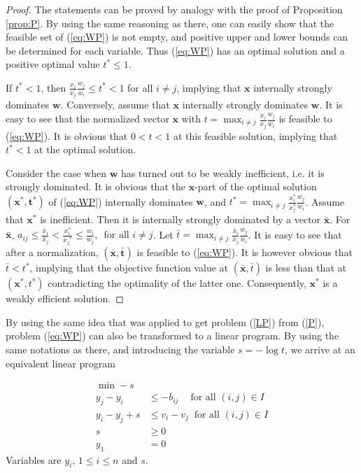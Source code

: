 \documentclass{article}
\theoremstyle{plain}
\begin{document}
\begin{proof}
The statements can be proved by analogy with the proof of Proposition \ref{prop:P}. By using the same reasoning as there, one can easily show that the feasible set of (\ref{eq:WP}) is not empty, and positive upper and lower bounds can be determined for each variable. Thus (\ref{eq:WP}) has an optimal solution and a positive optimal value $t^{\ast}\le 1$.

If $t^{\ast} < 1$, then
$\frac{x_{i}}{x_{j}} \frac{w_{j}}{w_{i}}\le t^{\ast} < 1$ for all $i \neq j$, implying that $\mathbf{x}$ internally strongly dominates $\mathbf{w}$. Conversely, assume that $\mathbf{x}$ internally strongly dominates $\mathbf{w}$. It is easy to see that the normalized vector $\mathbf{x}$ with
$t = \max_{i \neq j}\frac{x_{i}}{x_{j}} \frac{w_{j}}{w_{i}}$ is feasible to (\ref{eq:WP}). It is obvious that $0<t<1$ at this feasible solution, implying that $t^{\ast} < 1$ at the optimal solution.

Consider the case when $\mathbf{w}$ has turned out to be weakly inef{\kern0pt}f{\kern0pt}icient, i.e. it is strongly dominated.  It is obvious that the $\mathbf{x}$-part of the optimal solution $(\mathbf{x}^{\ast},\mathbf{t}^{\ast})$ of (\ref{eq:WP}) internally dominates $\mathbf{w}$, and $t^{\ast}=\max_{i \neq j} \frac{x_{i}^{\ast}}{x_{j}^{\ast}} \frac{w_{j}}{w_{i}}$. Assume that $\mathbf{x}^{\ast}$ is inef{\kern0pt}f{\kern0pt}icient. Then it is internally strongly dominated by a vector $\mathbf{\bar x}$. For $\mathbf{\bar x}$,
$a_{ij}\le\frac{\bar x_i}{\bar x_j} < \frac{x_i^{\ast}}{{x_j}^{\ast}}\le\frac{ w_i}{w_j},\, \text{ for all } i \neq j$.   Let
$\bar t=\max_{i \neq j} \frac{\bar x_{i}}{\bar x_{j}} \frac{w_{j}}{w_{i}}$.
It is easy to see that after a normalization, $(\mathbf{\bar x},\mathbf{\bar t})$ is feasible to (\ref{eq:WP}). It is however obvious that  $\bar t < t^{\ast}$, implying that the objective function value at $(\mathbf{\bar x},{\bar t})$ is less than that at $(\mathbf{x}^{\ast},{t}^{\ast})$ contradicting the optimality of the latter one. Consequently, $\mathbf{x}^{\ast}$ is a weakly  ef{\kern0pt}f{\kern0pt}icient solution.
\end{proof}

By using the same idea that was applied to get problem  (\ref{LP}) from (\ref{P}), problem (\ref{eq:WP}) can also be transformed to a linear program.
By using the same notations as there, and introducing the variable
$s = - \log t$, we arrive at an equivalent linear program

\begin{align}
\min - s
     &   \nonumber  \\
y_j - y_i  & \leq - b_{ij} \ \ \ \ \text{ for all $(i,j) \in I$} \nonumber  \\
y_i - y_j + s & \leq  v_i - v_j  \ \text{ for all $(i,j) \in I$} \label{eq:WLP} \\ %
s  & \geq 0  \nonumber \\
                   y_1 & = 0     \nonumber
\end{align}
Variables are $y_i, \,  1 \leq i \leq n$ and $s$. \\
\end{document}
